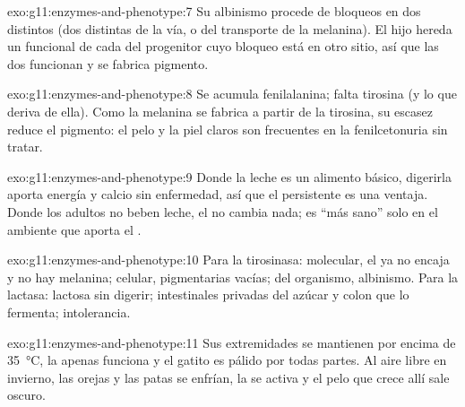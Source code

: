 \begin{solution}{exo:g11:enzymes-and-phenotype:7}
Su albinismo procede de bloqueos en dos  distintos (dos 
distintas de la vía, o del transporte de la melanina). El hijo hereda
un  funcional de cada  del progenitor cuyo bloqueo está en
otro sitio, así que las dos  funcionan y se fabrica pigmento.
\end{solution}

\begin{solution}{exo:g11:enzymes-and-phenotype:8}
Se acumula fenilalanina; falta tirosina (y lo que deriva de ella). Como
la melanina se fabrica a partir de la tirosina, su escasez reduce el
pigmento: el pelo y la piel claros son frecuentes en la fenilcetonuria
sin tratar.
\end{solution}

\begin{solution}{exo:g11:enzymes-and-phenotype:9}
Donde la leche es un alimento básico, digerirla aporta energía y calcio
sin enfermedad, así que el  persistente es una ventaja. Donde los
adultos no beben leche, el  no cambia nada; es ``más sano'' solo
en el ambiente que aporta el .
\end{solution}

\begin{solution}{exo:g11:enzymes-and-phenotype:10}
Para la tirosinasa: molecular, el  ya no encaja y no hay
melanina; celular,  pigmentarias vacías; del organismo,
albinismo. Para la lactasa: lactosa sin digerir;  intestinales
privadas del azúcar y colon que lo fermenta; intolerancia.
\end{solution}

\begin{solution}{exo:g11:enzymes-and-phenotype:11}
Sus extremidades se mantienen por encima de \qty{35}{\celsius}, la
 apenas funciona y el gatito es pálido por todas partes. Al aire
libre en invierno, las orejas y las patas se enfrían, la  se
activa y el pelo que crece allí sale oscuro.
\end{solution}

